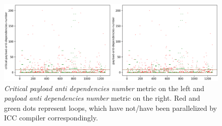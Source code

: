 \begin{figure}[h]
	\centering
	\includegraphics[width=\linewidth]{figs/loop-dependencies-number-2.png}
	\caption{\textit{Critical payload anti dependencies number} metric on the left and \textit{payload anti dependencies number} metric on the right. Red and green dots represent loops, which have not/have been parallelized by ICC compiler correspondingly.}
	\label{loop-dependencies-number-2}
\end{figure}